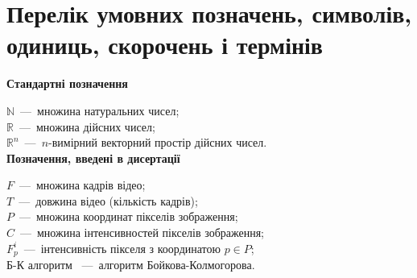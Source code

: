 \chapter*{Перелік умовних позначень, символів, одиниць, скорочень і термінів}

\textbf{Стандартні позначення}

 \noindent$\mathbb{N}$~---~множина натуральних чисел; \\
 \noindent$\mathbb{R}$~---~множина дійсних чисел; \\
 \noindent$\mathbb{R}^n$~---~$n$-вимірний векторний простір дійсних чисел. \\

\textbf{Позначення, введені в дисертації}

 \noindent$F$~---~множина кадрів відео; \\
 \noindent$T$~---~довжина відео (кількість кадрів); \\
 \noindent$P$~---~множина координат пікселів зображення; \\
 \noindent$C$~---~множина інтенсивностей пікселів зображення; \\
 \noindent$F_p^i$~---~інтенсивність пікселя з координатою $p \in P$; \\
 Б-К алгоритм ~---~алгоритм Бойкова-Колмогорова. \\
